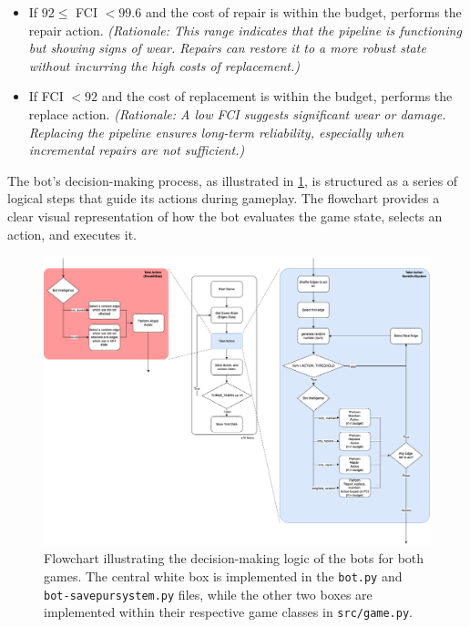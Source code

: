 \documentclass[12pt,a4paper]{report}
\begin{document}
\begin{itemize}
\begin{itemize}
\begin{itemize}
                    \item If $ 92 \leq$ FCI $< 99.6$ and the cost of repair is within the budget, performs the repair action.
                    \textit{(Rationale: This range indicates that the pipeline is functioning but showing signs of wear. Repairs can restore it to a more robust state without incurring the high costs of replacement.)}

                    \item If FCI $< 92$ and the cost of replacement is within the budget, performs the replace action.
                    \textit{(Rationale: A low FCI suggests significant wear or damage. Replacing the pipeline ensures long-term reliability, especially when incremental repairs are not sufficient.)}

                \end{itemize} 
            \end{itemize}
        \end{itemize}  

        The bot’s decision-making process, as illustrated in \cref{fig:bot-logic}, is structured as a series of logical steps that guide its actions during gameplay. The flowchart provides a clear visual representation of how the bot evaluates the game state, selects an action, and executes it.

        \begin{figure}[!htbp]
            \centering
            \includegraphics[width=0.8\textheight, angle=90]{images/bot-logic.png}
            \caption{Flowchart illustrating the decision-making logic of the bots for both games. The central white box is implemented in the \texttt{bot.py} and \texttt{bot-savepursystem.py} files, while the other two boxes are implemented within their respective game classes in \texttt{src/game.py}.}
            \label{fig:bot-logic}
        \end{figure}
\end{document}
